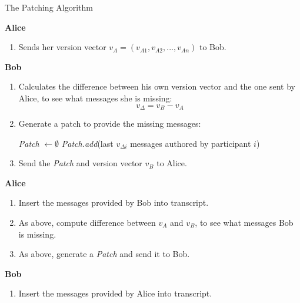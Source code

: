 \documentclass[a4paper, 12pt]{report}
\begin{document}
\begin{algorithm}
\caption{The Patching Algorithm}
\label{alg:patching}
{\bfseries Alice}
\begin{enumerate}
    \item Sends her version vector $v_A = (v_{A1}, v_{A2}, ..., v_{An})$ to Bob. \\
\end{enumerate}

{\bfseries Bob}
\begin{enumerate}
    \item Calculates the difference between his own version vector and the one sent by Alice, to see what messages she is missing:
        \begin{equation*}
            v_{\Delta} = v_B - v_A
        \end{equation*}
    \item {Generate a patch to provide the missing messages: \newline \vspace{-5mm}}
        \begin{algorithmic}
            \STATE \textit{Patch} $\leftarrow \emptyset$
                    \STATE \textit{Patch.add}(last $v_{\Delta i}$ messages authored by participant $i$)                        
                \ENDIF
            \ENDFOR
        \end{algorithmic}
    \item Send the \textit{Patch} and version vector $v_B$ to Alice. \\
\end{enumerate}

{\bfseries Alice}
\begin{enumerate}
    \item Insert the messages provided by Bob into transcript.
    \item As above, compute difference between $v_A$ and $v_B$, to see what messages Bob is missing.
    \item As above, generate a \textit{Patch} and send it to Bob. \\
\end{enumerate}

{\bfseries Bob}
\begin{enumerate}
    \item Insert the messages provided by Alice into transcript.
\end{enumerate}
\end{algorithm}
\end{document}

